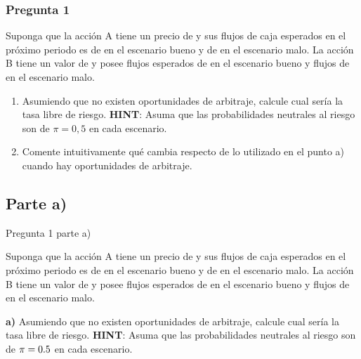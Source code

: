 \documentclass{beamer}
\begin{document}

\begin{frame}
  \frametitle{Pregunta 1}
    Suponga que la acción A tiene un precio de \dinero{\PaccionA} y sus flujos de caja esperados en el próximo periodo 
    es de \dinero{\FlujobuenoA} en el escenario bueno y de \dinero{\FlujomaloA} en el escenario malo. La acción B tiene un valor de 
    \dinero{\PaccionB} y posee flujos esperados de \dinero{\FlujobuenoB} en el escenario bueno y flujos de \dinero{\FlujomaloB} en el escenario malo. 
    
    \vspace{1em}

    \begin{enumerate}[label=\textbf{\alph*)}]
    \item   Asumiendo que no existen oportunidades de arbitraje, calcule cual sería la tasa libre de riesgo.
    \textbf{HINT}: Asuma que las probabilidades neutrales al riesgo son de $\pi=0,5$ en cada escenario. 
    
    \item   Comente intuitivamente qué cambia respecto de lo utilizado en el punto a) cuando hay oportunidades de arbitraje. 
    
    \end{enumerate}
\end{frame}

\subsection{Parte a)}

\begin{frame}{Pregunta 1 parte a)}
\justify

  Suponga que la acción A tiene un precio de \dinero{\PaccionA} y sus flujos de caja esperados en el próximo periodo 
  es de \dinero{\FlujobuenoA} en el escenario bueno y de \dinero{\FlujomaloA} en el escenario malo. La acción B tiene un valor de 
  \dinero{\PaccionB} y posee flujos esperados de \dinero{\FlujobuenoB} en el escenario bueno y flujos de \dinero{\FlujomaloB} en el escenario malo. \\
  \vspace{1em}

  \textbf{a)}   Asumiendo que no existen oportunidades de arbitraje, calcule cual sería la tasa libre de riesgo.
  \textbf{HINT}: Asuma que las probabilidades neutrales al riesgo son de $\pi=0.5$ en cada escenario.\\

\end{frame}
\end{document}
